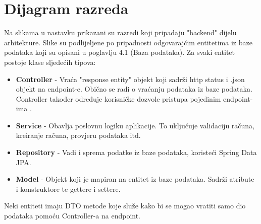 			\eject
			
			
		\section{Dijagram razreda}
		
			
			

Na slikama u nastavku prikazani su razredi koji pripadaju "backend" dijelu arhitekture. Slike su podlijeljene po pripadnosti odgovarajćim entitetima iz baze podataka koji su opisani u poglavlju 4.1 (Baza podataka). Za svaki entitet postoje klase sljedećih tipova:
\begin{itemize}
	        \item \textbf{Controller} - Vraća "response entity" objekt koji sadrži http status i .json objekt na endpoint-e. Obično se radi o vraćanju podataka iz baze podataka. Controller također određuje korisničke dozvole pristupa pojedinim endpoint-ima  .
	        \item \textbf{Service} - Obavlja poslovnu logiku aplikacije. To uključuje validaciju računa, kreiranje računa, provjeru podataka itd.
	        \item \textbf{Repository} - Vadi i sprema podatke iz baze podataka, koristeći Spring Data JPA.
	        \item \textbf{Model} - Objekt koji je mapiran na entitet iz baze podataka. Sadrži atribute i konstruktore te gettere i settere.
	    \end{itemize}
	    
Neki entiteti imaju DTO metode koje služe kako bi se mogao vratiti samo dio podataka pomoću Controller-a na endpoint.
	    

